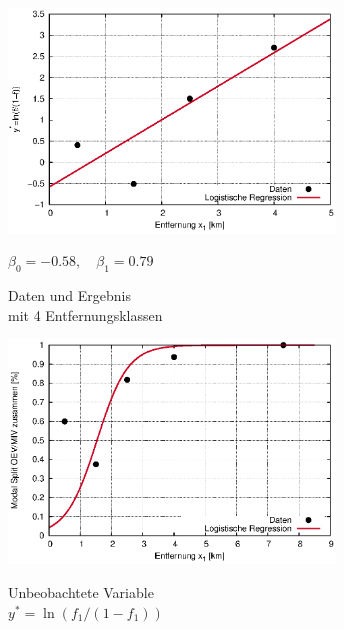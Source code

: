 \documentclass[a4paper]{foils}
\begin{document}
\begin{landscape}
\begin{center}
{\begin{center}
\includegraphics[width=0.65\textwidth]{figsRegr/regr_logistic_WS1516cum.eps}
\end{center}
}

 {\small $ \beta_0=-0.58, \quad \beta_1=0.79 $}


\newpage

\vspace{1em}

\parbox{0.65\textwidth}{
\begin{center}
{\small
Daten und Ergebnis\\mit 4 Entfernungsklassen\\
}
\vspace{1em}

\includegraphics[width=0.65\textwidth]{figsRegr/regr_logistic_WS1516cum_alt_f.eps}
\end{center}
}
\hspace{1em}
\parbox{0.65\textwidth}{
\begin{center}
{\small
Unbeobachtete Variable\\ $y^*=\ln(f_1/(1-f_1))$\\
}
\vspace{1em}


\end{center}}
\end{center}
\end{landscape}
\end{document}
